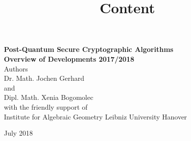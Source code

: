 \documentclass[a4paper,11pt]{article}
\begin{document}
\begin{titlepage}
\begin{center}

{\Huge{\textbf{Post-Quantum Secure Cryptographic Algorithms}}}\\[2cm]

\huge{\textbf{Overview of Developments 2017/2018}}\\[1cm]

\large{Authors}\\[0,2cm]
 
\Large{Dr. Math. Jochen Gerhard}\\ [0,2cm] 

\large{and }\\[0,2cm] 

\Large{Dipl. Math. Xenia Bogomolec}\\ [1,4cm] 

\large{with the friendly support of}\\[0,2cm]

\Large{Institute for Algebraic Geometry Leibniz University Hanover}\\[1cm]


 
\vspace{1cm}
 
\large{July 2018}
\end{center}
\end{titlepage}


\title{\textbf{\Large{Content}}}
\maketitle
\end{document}
